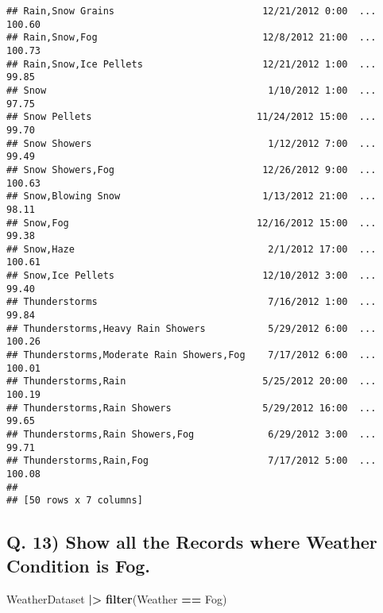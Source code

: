 \documentclass[
]{article}
\newenvironment{Shaded}{\begin{snugshade}}{\end{snugshade}}
\newcommand{\FunctionTok}[1]{\textcolor[rgb]{0.13,0.29,0.53}{\textbf{#1}}}
\newcommand{\NormalTok}[1]{#1}
\newcommand{\SpecialCharTok}[1]{\textcolor[rgb]{0.81,0.36,0.00}{\textbf{#1}}}
\newcommand{\StringTok}[1]{\textcolor[rgb]{0.31,0.60,0.02}{#1}}
\begin{document}
\begin{verbatim}
## Rain,Snow Grains                          12/21/2012 0:00  ...     100.60
## Rain,Snow,Fog                             12/8/2012 21:00  ...     100.73
## Rain,Snow,Ice Pellets                     12/21/2012 1:00  ...      99.85
## Snow                                       1/10/2012 1:00  ...      97.75
## Snow Pellets                             11/24/2012 15:00  ...      99.70
## Snow Showers                               1/12/2012 7:00  ...      99.49
## Snow Showers,Fog                          12/26/2012 9:00  ...     100.63
## Snow,Blowing Snow                         1/13/2012 21:00  ...      98.11
## Snow,Fog                                 12/16/2012 15:00  ...      99.38
## Snow,Haze                                  2/1/2012 17:00  ...     100.61
## Snow,Ice Pellets                          12/10/2012 3:00  ...      99.40
## Thunderstorms                              7/16/2012 1:00  ...      99.84
## Thunderstorms,Heavy Rain Showers           5/29/2012 6:00  ...     100.26
## Thunderstorms,Moderate Rain Showers,Fog    7/17/2012 6:00  ...     100.01
## Thunderstorms,Rain                        5/25/2012 20:00  ...     100.19
## Thunderstorms,Rain Showers                5/29/2012 16:00  ...      99.65
## Thunderstorms,Rain Showers,Fog             6/29/2012 3:00  ...      99.71
## Thunderstorms,Rain,Fog                     7/17/2012 5:00  ...     100.08
## 
## [50 rows x 7 columns]
\end{verbatim}

\hypertarget{q.-13-show-all-the-records-where-weather-condition-is-fog.}{%
\subsection{Q. 13) Show all the Records where Weather Condition is
Fog.}\label{q.-13-show-all-the-records-where-weather-condition-is-fog.}}

\begin{Shaded}
\begin{Highlighting}[]
\NormalTok{WeatherDataset }\SpecialCharTok{|\textgreater{}} 
  \FunctionTok{filter}\NormalTok{(Weather }\SpecialCharTok{==} \StringTok{\textquotesingle{}Fog\textquotesingle{}}\NormalTok{)}
\end{Highlighting}
\end{Shaded}
\end{document}

